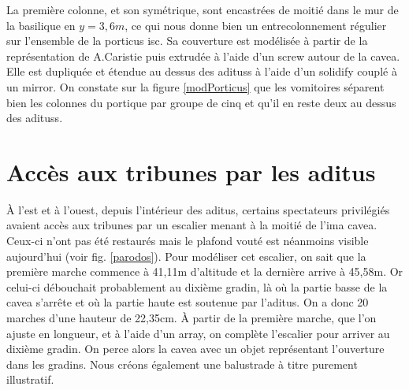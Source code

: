 La première colonne, et son symétrique, sont encastrées de moitié dans le mur de la basilique en $y=3,6m$, ce qui nous donne bien un entrecolonnement régulier sur l'ensemble de la \gls{porticus isc}. Sa couverture est modélisée à partir de la représentation de A.Caristie \cite[Pl. III et VI]{orangePl} puis extrudée à l'aide d'un \gls{screw} autour de la  \gls{cavea}. Elle est dupliquée et étendue au dessus des \glspl{aditus} à l'aide d'un \gls{solidify} couplé à un \gls{mirror}. On constate sur la figure \ref{modPorticus} que les vomitoires séparent bien les colonnes du portique par groupe de cinq et qu'il en reste deux au dessus des \glspl{aditus}.


\section{Accès aux tribunes par les \gls{aditus}} \label{sect-escaliers}

\`A l'est et à l'ouest, depuis l'intérieur des  \gls{aditus}, certains spectateurs privilégiés avaient accès aux tribunes par un escalier menant à la moitié de l'\gls{ima cavea}. Ceux-ci n'ont pas été restaurés mais le plafond vouté est néanmoins visible aujourd'hui (voir fig. \ref{parodos}). Pour modéliser cet escalier, on sait que la première marche commence à 41,11m d'altitude et la dernière arrive à 45,58m. Or celui-ci débouchait probablement au dixième gradin, là où la partie basse de la  \gls{cavea} s'arrête et où la partie haute est soutenue par l'\gls{aditus}. On a donc 20 marches d'une hauteur de 22,35cm. \`{A} partir de la première marche, que l'on ajuste en longueur, et à l'aide d'un \gls{array}, on complète l'escalier pour arriver au dixième gradin. On perce alors la \gls{cavea} avec un objet représentant l'ouverture dans les gradins. Nous créons également une balustrade à titre purement illustratif.

